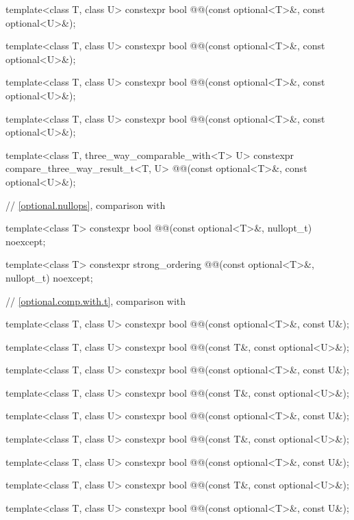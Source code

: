 \begin{codeblock}
{  template<class T, class U>
  constexpr bool @@(const optional<T>&, const optional<U>&);

  template<class T, class U>
  constexpr bool @@(const optional<T>&, const optional<U>&);

  template<class T, class U>
  constexpr bool @@(const optional<T>&, const optional<U>&);

  template<class T, class U>
  constexpr bool @@(const optional<T>&, const optional<U>&);

  template<class T, three_way_comparable_with<T> U>
  constexpr compare_three_way_result_t<T, U> @@(const optional<T>&,
                                                         const optional<U>&);

  // \ref{optional.nullops}, comparison with 

  template<class T> constexpr bool @@(const optional<T>&, nullopt_t) noexcept;

  template<class T>
  constexpr strong_ordering @@(const optional<T>&, nullopt_t) noexcept;

  // \ref{optional.comp.with.t}, comparison with 

  template<class T, class U> constexpr bool @@(const optional<T>&, const U&);

  template<class T, class U> constexpr bool @@(const T&, const optional<U>&);

  template<class T, class U> constexpr bool @@(const optional<T>&, const U&);

  template<class T, class U> constexpr bool @@(const T&, const optional<U>&);

  template<class T, class U> constexpr bool @@(const optional<T>&, const U&);

  template<class T, class U> constexpr bool @@(const T&, const optional<U>&);

  template<class T, class U> constexpr bool @@(const optional<T>&, const U&);

  template<class T, class U> constexpr bool @@(const T&, const optional<U>&);

  template<class T, class U> constexpr bool @@(const optional<T>&, const U&);

}
\end{codeblock}
